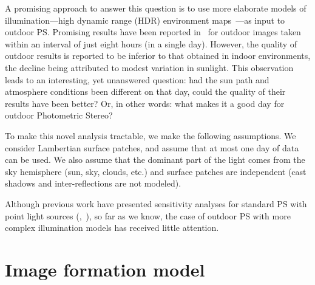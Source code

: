 A promising approach to answer this question is to use more elaborate models of illumination---high dynamic range (HDR) environment maps~\cite{reinhard-book-05}---as input to outdoor PS. Promising results have been reported in~\cite{yu-iccp-13} for outdoor images taken within an interval of just eight hours (in a single day). However, the quality of outdoor results is reported to be inferior to that obtained in indoor environments, the decline being attributed to modest variation in sunlight. This observation leads to an interesting, yet unanswered question: had the sun path and atmosphere conditions been different on that day, could the quality of their results have been better? Or, in other words: what makes it a good day for outdoor Photometric Stereo?


To make this novel analysis tractable, we make the following assumptions. We consider Lambertian surface patches, and assume that at most one day of data can be used. We also assume that the dominant part of the light comes from the sky hemisphere (sun, sky, clouds, etc.) and surface patches are independent (cast shadows and inter-reflections are not modeled).

Although previous work have presented sensitivity analyses for standard PS with point light sources (\eg,~\cite{sun-ivc-07,jiang-bunke-sp-91,klaudiny-prl-14,shen-pg-14}), so far as we know, the case of outdoor PS with more complex illumination models has received little attention.

\section{Image formation model}
\label{iccp15:ifm}

